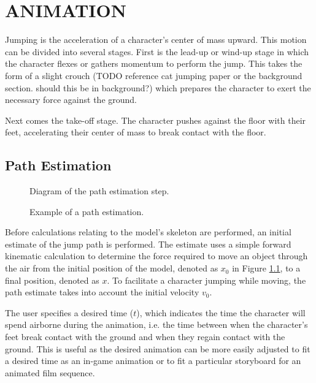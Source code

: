  
\chapter{ANIMATION}
\label{chapter:animation}

Jumping is the acceleration of a character's center of mass upward.  This motion can be divided into several stages.  First is the lead-up or wind-up stage in which the character flexes or gathers momentum to perform the jump.  This takes the form of a slight crouch (TODO reference cat jumping paper or the background section.  should this be in background?) which prepares the character to exert the necessary force against the ground.  

Next comes the take-off stage.  The character pushes against the floor with their feet, accelerating their center of mass to break contact with the floor.  

\section{Path Estimation}

\begin{figure}[ht]
	\label{fig:pathEstimate}
	\centering
	
	\caption{Diagram of the path estimation step.}
\end{figure}

\begin{figure}[ht]
	\label{fig:pathExample}
	\caption{Example of a path estimation.}
\end{figure}
Before calculations relating to the model's skeleton are performed, an initial estimate of the jump path is performed.  The estimate uses a simple forward kinematic calculation to determine the force required to move an object through the air from the initial position of the model, denoted as $x_0$ in Figure \ref{fig:pathEstimate}, to a final position, denoted as $x$.  To facilitate a character jumping while moving, the path estimate takes into account the initial velocity $v_0$.

The user specifies a desired time ($t$), which indicates the time the character will spend airborne during the animation, i.e. the time between when the character's feet break contact with the ground and when they regain contact with the ground.  This is useful as the desired animation can be more easily adjusted to fit a desired time as an in-game animation or to fit a particular storyboard for an animated film sequence.

